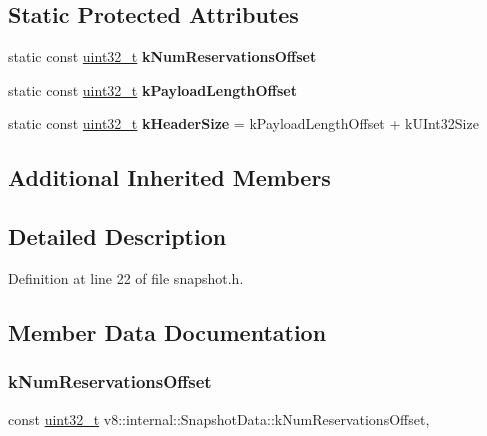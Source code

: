 \subsection*{Static Protected Attributes}
\begin{DoxyCompactItemize}
\item 
static const \mbox{\hyperlink{classuint32__t}{uint32\+\_\+t}} {\bfseries k\+Num\+Reservations\+Offset}
\item 
static const \mbox{\hyperlink{classuint32__t}{uint32\+\_\+t}} {\bfseries k\+Payload\+Length\+Offset}
\item 
\mbox{\label{classv8_1_1internal_1_1SnapshotData_a0895a7571369257e2e9bb545327906c7}} 
static const \mbox{\hyperlink{classuint32__t}{uint32\+\_\+t}} {\bfseries k\+Header\+Size} = k\+Payload\+Length\+Offset + k\+U\+Int32\+Size
\end{DoxyCompactItemize}
\subsection*{Additional Inherited Members}


\subsection{Detailed Description}


Definition at line 22 of file snapshot.\+h.



\subsection{Member Data Documentation}
\mbox{\label{classv8_1_1internal_1_1SnapshotData_a515a2c5cb30881d394e8630b7ebce8b2}} 
\subsubsection{\texorpdfstring{k\+Num\+Reservations\+Offset}{kNumReservationsOffset}}
{\footnotesize\ttfamily const \mbox{\hyperlink{classuint32__t}{uint32\+\_\+t}} v8\+::internal\+::\+Snapshot\+Data\+::k\+Num\+Reservations\+Offset\hspace{0.3cm}{\ttfamily [static]}, {\ttfamily [protected]}}

